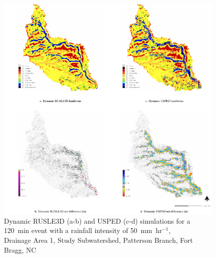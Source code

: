 \documentclass[gmd, manuscript]{copernicus}
\begin{document}

\begin{figure}
\center
\includegraphics[width=\textwidth,height=0.925\textheight,keepaspectratio]{figures/simulations.pdf}
\caption{Dynamic RUSLE3D (a-b) and USPED (c-d) simulations
for a 120~\unit{min} event with a rainfall intensity of 50~\unit{mm~hr}$^{-1}$,\\
Drainage Area 1, Study Subwatershed, Patterson Branch, Fort Bragg, NC}
\label{fig:simulations}
\end{figure}
\end{document}

